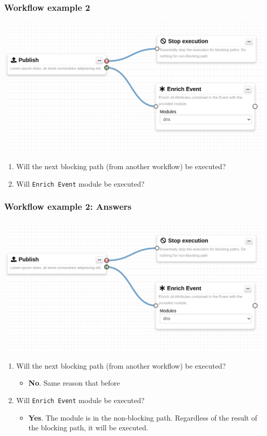 \begin{frame}
    \frametitle{Workflow example 2}
    \begin{center}
        \includegraphics[width=0.9\linewidth]{pictures/example-2.png}
    \end{center}

    \begin{enumerate}
        \item Will the next blocking path (from another workflow) be executed?
        \item Will \texttt{Enrich Event} module be executed?
    \end{enumerate}
\end{frame}
\begin{frame}
    \frametitle{Workflow example 2: Answers}
    \begin{center}
        \includegraphics[width=0.7\linewidth]{pictures/example-2.png}
    \end{center}

    \begin{enumerate}
        \item Will the next blocking path (from another workflow) be executed?
        \begin{itemize}
            \item \textbf{No}. Same reason that before
        \end{itemize}
        \item Will \texttt{Enrich Event} module be executed?
        \begin{itemize}
            \item \textbf{Yes}. The module is in the non-blocking path. Regardless of the result of the blocking path, it will be executed.
        \end{itemize}
    \end{enumerate}
\end{frame}

